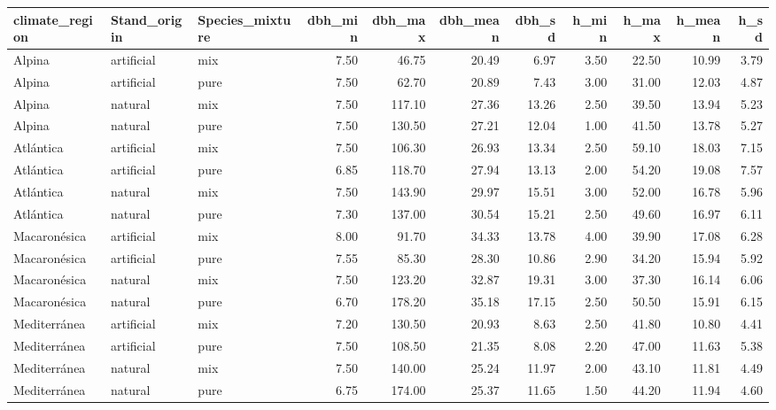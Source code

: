 \begin{table}[ht]
\centering
\begin{tabular}{lllrrrrrrrr}
  \hline
climate\_region & Stand\_origin & Species\_mixture & dbh\_min & dbh\_max & dbh\_mean & dbh\_sd & h\_min & h\_max & h\_mean & h\_sd \\ 
  \hline
Alpina & artificial & mix & 7.50 & 46.75 & 20.49 & 6.97 & 3.50 & 22.50 & 10.99 & 3.79 \\ 
  Alpina & artificial & pure & 7.50 & 62.70 & 20.89 & 7.43 & 3.00 & 31.00 & 12.03 & 4.87 \\ 
  Alpina & natural & mix & 7.50 & 117.10 & 27.36 & 13.26 & 2.50 & 39.50 & 13.94 & 5.23 \\ 
  Alpina & natural & pure & 7.50 & 130.50 & 27.21 & 12.04 & 1.00 & 41.50 & 13.78 & 5.27 \\ 
  Atlántica & artificial & mix & 7.50 & 106.30 & 26.93 & 13.34 & 2.50 & 59.10 & 18.03 & 7.15 \\ 
  Atlántica & artificial & pure & 6.85 & 118.70 & 27.94 & 13.13 & 2.00 & 54.20 & 19.08 & 7.57 \\ 
  Atlántica & natural & mix & 7.50 & 143.90 & 29.97 & 15.51 & 3.00 & 52.00 & 16.78 & 5.96 \\ 
  Atlántica & natural & pure & 7.30 & 137.00 & 30.54 & 15.21 & 2.50 & 49.60 & 16.97 & 6.11 \\ 
  Macaronésica & artificial & mix & 8.00 & 91.70 & 34.33 & 13.78 & 4.00 & 39.90 & 17.08 & 6.28 \\ 
  Macaronésica & artificial & pure & 7.55 & 85.30 & 28.30 & 10.86 & 2.90 & 34.20 & 15.94 & 5.92 \\ 
  Macaronésica & natural & mix & 7.50 & 123.20 & 32.87 & 19.31 & 3.00 & 37.30 & 16.14 & 6.06 \\ 
  Macaronésica & natural & pure & 6.70 & 178.20 & 35.18 & 17.15 & 2.50 & 50.50 & 15.91 & 6.15 \\ 
  Mediterránea & artificial & mix & 7.20 & 130.50 & 20.93 & 8.63 & 2.50 & 41.80 & 10.80 & 4.41 \\ 
  Mediterránea & artificial & pure & 7.50 & 108.50 & 21.35 & 8.08 & 2.20 & 47.00 & 11.63 & 5.38 \\ 
  Mediterránea & natural & mix & 7.50 & 140.00 & 25.24 & 11.97 & 2.00 & 43.10 & 11.81 & 4.49 \\ 
  Mediterránea & natural & pure & 6.75 & 174.00 & 25.37 & 11.65 & 1.50 & 44.20 & 11.94 & 4.60 \\ 
   \hline
\end{tabular}
\end{table}
